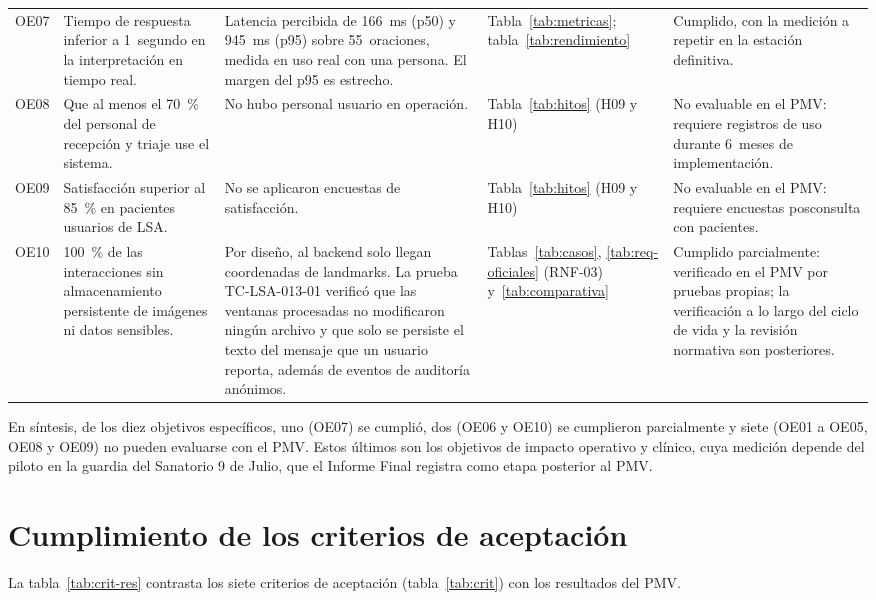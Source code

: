 {\begin{longtable}{@{}p{0.9cm}p{3.3cm}p{5.0cm}p{2.7cm}p{3.1cm}@{}}
OE07 & Tiempo de respuesta inferior a 1~segundo en la interpretación en tiempo real. & Latencia percibida de 166~ms (p50) y 945~ms (p95) sobre 55~oraciones, medida en uso real con una persona. El margen del p95 es estrecho. & Tabla~\ref{tab:metricas}; tabla~\ref{tab:rendimiento} & Cumplido, con la medición a repetir en la estación definitiva. \\
OE08 & Que al menos el 70~\% del personal de recepción y triaje use el sistema. & No hubo personal usuario en operación. & Tabla~\ref{tab:hitos} (H09 y H10) & No evaluable en el PMV: requiere registros de uso durante 6~meses de implementación. \\
OE09 & Satisfacción superior al 85~\% en pacientes usuarios de LSA. & No se aplicaron encuestas de satisfacción. & Tabla~\ref{tab:hitos} (H09 y H10) & No evaluable en el PMV: requiere encuestas posconsulta con pacientes. \\
OE10 & 100~\% de las interacciones sin almacenamiento persistente de imágenes ni datos sensibles. & Por diseño, al backend solo llegan coordenadas de landmarks. La prueba TC-LSA-013-01 verificó que las ventanas procesadas no modificaron ningún archivo y que solo se persiste el texto del mensaje que un usuario reporta, además de eventos de auditoría anónimos. & Tablas~\ref{tab:casos}, \ref{tab:req-oficiales} (RNF-03) y~\ref{tab:comparativa} & Cumplido parcialmente: verificado en el PMV por pruebas propias; la verificación a lo largo del ciclo de vida y la revisión normativa son posteriores. \\
\end{longtable}
}

En síntesis, de los diez objetivos específicos, uno (OE07) se cumplió, dos (OE06 y OE10) se cumplieron parcialmente y siete (OE01 a OE05, OE08 y OE09) no pueden evaluarse con el PMV. Estos últimos son los objetivos de impacto operativo y clínico, cuya medición depende del piloto en la guardia del Sanatorio 9 de Julio, que el Informe Final registra como etapa posterior al PMV.

\section{Cumplimiento de los criterios de aceptación}\label{sec:res-criterios}

La tabla~\ref{tab:crit-res} contrasta los siete criterios de aceptación (tabla~\ref{tab:crit}) con los resultados del PMV.

